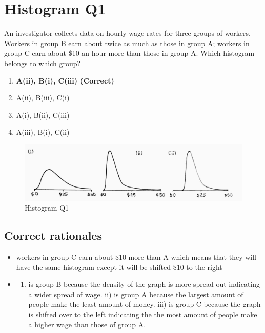 \documentclass[letterpaper,10pt,twoside,printwatermark=false]{pinp}
\providecommand{\tightlist}{%
  \setlength{\itemsep}{0pt}\setlength{\parskip}{0pt}}
\begin{document}
\section{Histogram Q1}\label{histogram-q1}

An investigator collects data on hourly wage rates for three groups of
workers. Workers in group B earn about twice as much as those in group
A; workers in group C earn about \$10 an hour more than those in group
A. Which histogram belongs to which group?

\begin{enumerate}
\def\labelenumi{\alph{enumi})}
\tightlist
\item
  \textbf{A(ii), B(i), C(iii) (Correct)}
\item
  A(ii), B(iii), C(i)
\item
  A(i), B(ii), C(iii)
\item
  A(iii), B(i), C(ii)
\end{enumerate}

\begin{figure}[H]
  \begin{center}
    \includegraphics[scale=0.19]{hist_q1.jpg} 
  \end{center}
  \caption{Histogram Q1}\label{fig}
\end{figure}

\subsection{Correct rationales}\label{correct-rationales-4}

\begin{itemize}
\item
  workers in group C earn about \$10 more than A which means that they
  will have the same histogram except it will be shifted \$10 to the
  right
\item
  \begin{enumerate}
  \def\labelenumi{\roman{enumi})}
  \tightlist
  \item
    is group B because the density of the graph is more spread out
    indicating a wider spread of wage. ii) is group A because the
    largest amount of people make the least amount of money. iii) is
    group C because the graph is shifted over to the left indicating the
    the most amount of people make a higher wage than those of group A.
  \end{enumerate}
\end{itemize}
\end{document}

